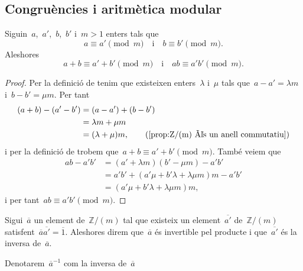 \documentclass[../../main.tex]{subfiles}
\begin{document}
    \subsection{Congruències i aritmètica modular}
    \begin{proposition}
        Siguin~\(a\),~\(a'\),~\(b\),~\(b'\) i~\(m>1\) enters tals que
        \[
            a\equiv a'\pmod{m}\quad\text{i}\quad b\equiv b'\pmod{m}.
        \]
        Aleshores
        \[
            a+b\equiv a'+b'\pmod{m}\quad\text{i}\quad ab\equiv a'b'\pmod{m}.
        \]
        \begin{proof}
            Per la definició de  tenim que existeixen enters~\(\lambda\) i~\(\mu\) tals que~\(a-a'=\lambda m\) i~\(b-b'=\mu m\).
            Per tant
            \begin{align*}
            (a+b)-(a'-b')&=(a-a')+(b-b')\\
            &=\lambda m+\mu m\\
            &=(\lambda+\mu)m,\tag{\ref{prop:Z/(m) és un anell commutatiu}}
            \end{align*}
            i per la definició de  trobem que~\(a+b\equiv a'+b'\pmod{m}\).
            També veiem que
            \begin{align*}
            ab-a'b'&=(a'+\lambda m)(b'-\mu m)-a'b'\\
            &=a'b'+(a'\mu+b'\lambda+\lambda\mu m)m-a'b'\\
            &=(a'\mu+b'\lambda+\lambda\mu m)m,
            \end{align*}
            i per tant~\(ab\equiv a'b'\pmod{m}\).
        \end{proof}
    \end{proposition}
    \begin{definition}
        \label{def:nombre modular invertible}
        Sigui~\(\overline{a}\) un element de~\(\mathbb{Z}/(m)\) tal que existeix un element~\(\overline{a'}\) de~\(\mathbb{Z}/(m)\) satisfent~\(\overline{a}\overline{a'}=\overline{1}\).
        Aleshores direm que~\(\overline{a}\) és invertible pel producte i que~\(\overline{a'}\) és la inversa de~\(\overline{a}\).

        Denotarem~\(\overline{a}^{-1}\) com la inversa de~\(\overline{a}\)
    \end{definition}
\end{document}
